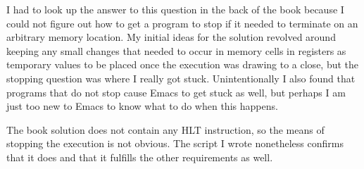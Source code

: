 \documentclass{article}
\begin{document}
I had to look up the answer to this question in the back of the book because
I could not figure out how to get a program to stop if it needed to terminate
on an arbitrary memory location. My initial ideas for the solution revolved
around keeping any small changes that needed to occur in memory cells in
registers as temporary values to be placed once the execution was drawing
to a close, but the stopping question was where I really got stuck. Unintentionally
I also found that programs that do not stop cause Emacs to get stuck as well,
but perhaps I am just too new to Emacs to know what to do when this happens.

\par

The book solution does not contain any HLT instruction, so the means of stopping
the execution is not obvious.  The script I wrote nonetheless confirms that it
does and that it fulfills the other requirements as well.
\end{document}
